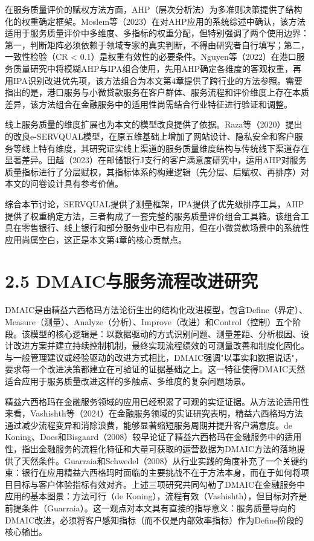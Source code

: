 在服务质量评价的赋权方法方面，AHP（层次分析法）为多准则决策提供了结构化的权重确定框架。Moslem等（2023）在对AHP应用的系统综述中确认，该方法适用于服务质量评价中多维度、多指标的权重分配，但特别强调了两个使用边界：第一，判断矩阵必须依赖于领域专家的真实判断，不得由研究者自行填写；第二，一致性检验（CR < 0.1）是权重有效性的必要条件\cite{ref41}。Nguyen等（2022）在港口服务质量研究中将模糊AHP与IPA组合使用，先用AHP确定各维度的客观权重，再用IPA识别改进优先项，该方法组合为本文第4章提供了跨行业的方法参照\cite{ref42}。需要指出的是，港口服务与小微贷款服务在客户群体、服务流程和评价维度上存在本质差异，该方法组合在金融服务中的适用性尚需结合行业特征进行验证和调整。\par

线上服务质量的维度扩展也为本文的模型改良提供了依据。Raza等（2020）提出的改良e-SERVQUAL模型，在原五维基础上增加了网站设计、隐私安全和客户服务等线上特有维度，其研究证实线上渠道的服务质量维度结构与传统线下渠道存在显著差异\cite{ref43}。田越（2023）在邮储银行J支行的客户满意度研究中，运用AHP对服务质量指标进行了分层赋权，其指标体系的构建逻辑（先分层、后赋权、再排序）对本文的问卷设计具有参考价值\cite{ref44}。\par

综合本节讨论，SERVQUAL提供了测量框架，IPA提供了优先级排序工具，AHP提供了权重确定方法，三者构成了一套完整的服务质量评价组合工具箱。该组合工具在零售银行、线上银行和部分服务业中已有应用，但在小微贷款场景中的系统性应用尚属空白，这正是本文第4章的核心贡献点。\par

\section{2.5 DMAIC与服务流程改进研究}

DMAIC是由精益六西格玛方法论衍生出的结构化改进模型，包含Define（界定）、Measure（测量）、Analyze（分析）、Improve（改进）和Control（控制）五个阶段。该模型的核心逻辑是：以数据驱动的方式识别问题、测量差距、分析根因、设计改进方案并建立持续控制机制，最终实现流程绩效的可测量改善和制度化固化。与一般管理建议或经验驱动的改进方式相比，DMAIC强调"以事实和数据说话"，要求每一个改进决策都建立在可验证的证据基础之上。这一特征使得DMAIC天然适合应用于服务质量改进这样的多触点、多维度的复杂问题场景。\par

精益六西格玛在金融服务领域的应用已经积累了可观的实证证据。从方法论适用性来看，Vashishth等（2024）在金融服务领域的实证研究表明，精益六西格玛方法通过减少流程变异和消除浪费，能够显著缩短服务周期并提升客户满意度\cite{ref46}。de Koning、Does和Bisgaard（2008）较早论证了精益六西格玛在金融服务中的适用性，指出金融服务的流程化特征和大量可获取的运营数据为DMAIC方法的落地提供了天然条件\cite{ref47}。Guarraia和Schwedel（2008）从行业实践的角度补充了一个关键约束：银行在应用精益六西格玛时面临的主要挑战不在于方法本身，而在于如何将项目目标与客户体验指标有效对齐\cite{ref48}。上述三项研究共同勾勒了DMAIC在金融服务中应用的基本图景：方法可行（de Koning），流程有效（Vashishth），但目标对齐是前提条件（Guarraia）。这一观点对本文具有直接的指导意义：服务质量导向的DMAIC改进，必须将客户感知指标（而不仅是内部效率指标）作为Define阶段的核心输出。\par

